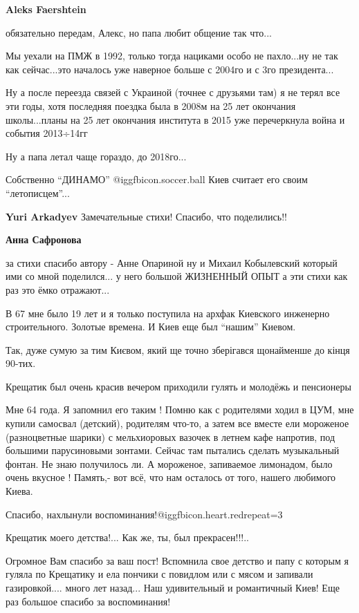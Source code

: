 \begin{itemize}
\begin{itemize}
\begin{itemize}
\textbf{Aleks Faershtein} 

обязательно передам, Алекс, но папа любит общение так что...

Мы уехали на ПМЖ в 1992, только тогда нациками особо не пахло...ну не так как
сейчас...это началось уже наверное больше с 2004го и с 3го президента...

Ну а после переезда связей с Украиной (точнее с друзьями там) я не терял все
эти годы, хотя последняя поездка была в 2008м на 25 лет окончания школы...планы
на 25 лет окончания института в 2015 уже перечеркнула война и события 2013÷14гг

Ну а папа летал чаще гораздо, до 2018го...

Собственно \enquote{ДИНАМО}  @igg{fbicon.soccer.ball}  Киев считает его своим \enquote{летописцем}...

\end{itemize} %

\textbf{Yuri Arkadyev} Замечательные стихи! Спасибо, что поделились!!

\textbf{Анна Сафронова} 

за стихи спасибо автору - Анне Опариной ну и Михаил Кобылевский который ими со
мной поделился... у него большой ЖИЗНЕННЫЙ ОПЫТ а эти стихи как раз это ёмко
отражают...

\end{itemize} %


В 67 мне было 19 лет и я только поступила на архфак Киевского инженерно
строительного. Золотые времена. И Киев еще был \enquote{нашим} Киевом.

Так, дуже сумую за тим Києвом, який ще точно зберігався щонайменше до кінця 90-тих.

Крещатик был очень красив вечером приходили гулять и молодёжь и пенсионеры


Мне 64 года. Я запомнил его таким ! Помню как с родителями ходил в ЦУМ, мне
купили самосвал (детский), родителям что-то, а затем все вместе ели мороженое
(разноцветные шарики) с мельхиоровых вазочек в летнем кафе напротив, под
большими парусиновыми зонтами. Сейчас там пытались сделать музыкальный фонтан.
Не знаю получилось ли. А мороженое, запиваемое лимонадом, было очень вкусное !
Память,- вот всё, что нам осталось от того, нашего любимого Киева.

Спасибо, нахлынули воспоминания!@igg{fbicon.heart.red}{repeat=3}

Крещатик моего детства!... Как же, ты, был прекрасен!!!..


Огромное Вам спасибо за ваш пост! Вспомнила свое детство и папу с которым я
гуляла по Крещатику и ела пончики с повидлом или с мясом и запивали
газировкой.... много лет назад... Наш удивительный и романтичный Киев! Еще раз
большое спасибо за воспоминания!

\end{itemize} %
